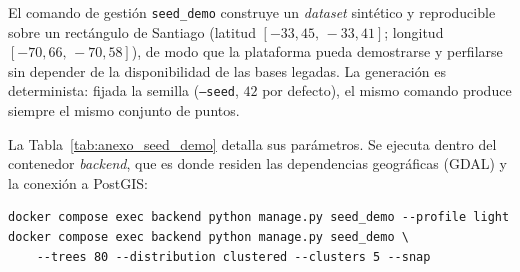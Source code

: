 El comando de gestión \texttt{seed\_demo} construye un \textit{dataset} sintético y
reproducible sobre un rectángulo de Santiago
(latitud $[-33{,}45,\,-33{,}41]$; longitud $[-70{,}66,\,-70{,}58]$), de modo que la
plataforma pueda demostrarse y perfilarse sin depender de la disponibilidad de las
bases legadas. La generación es determinista: fijada la semilla
(\texttt{--seed}, $42$ por defecto), el mismo comando produce siempre el mismo
conjunto de puntos.

La Tabla~\ref{tab:anexo_seed_demo} detalla sus parámetros. Se ejecuta dentro del
contenedor \textit{backend}, que es donde residen las dependencias geográficas (GDAL)
y la conexión a PostGIS:

\begin{verbatim}
docker compose exec backend python manage.py seed_demo --profile light
docker compose exec backend python manage.py seed_demo \
    --trees 80 --distribution clustered --clusters 5 --snap
\end{verbatim}

